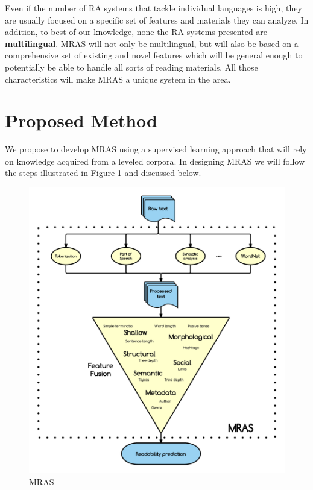\documentclass[12pt]{article}
\begin{document}



Even if the number of RA systems that tackle individual languages is high, they are usually focused on a specific set of features and materials they can analyze. In addition, to best of our knowledge, none the RA systems presented are \textbf{multilingual}. MRAS will not only be multilingual, but will also be based on a comprehensive set of existing and novel features which will be general enough to potentially be able to handle all sorts of reading materials. All those characteristics will make MRAS a unique system in the area.




\section{Proposed Method}

We propose to develop MRAS using a supervised learning approach that will rely on knowledge acquired from a leveled corpora. In designing MRAS we will follow the steps illustrated in Figure \ref{fig:pipeline} and discussed below.

\begin{figure}[h!]
\centering
\includegraphics[width=\textwidth]{pipelineGraph}
\caption{MRAS}
\label{fig:pipeline}
\end{figure}
\end{document}
